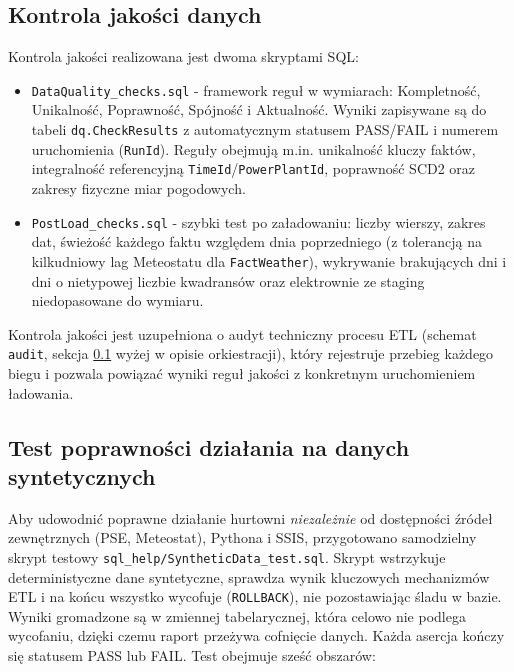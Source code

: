 \documentclass[12pt]{article}
\begin{document}
	\subsection{Kontrola jakości danych}
	\label{sec:dq}
	Kontrola jakości realizowana jest dwoma skryptami SQL:
	\begin{itemize}
		\item \texttt{DataQuality\_checks.sql} - framework reguł w wymiarach: Kompletność, Unikalność, Poprawność, Spójność i Aktualność. Wyniki zapisywane są do tabeli \texttt{dq.CheckResults} z automatycznym statusem PASS/FAIL i numerem uruchomienia (\texttt{RunId}). Reguły obejmują m.in. unikalność kluczy faktów, integralność referencyjną \texttt{TimeId}/\texttt{PowerPlantId}, poprawność SCD2 oraz zakresy fizyczne miar pogodowych.
		\item \texttt{PostLoad\_checks.sql} - szybki test po załadowaniu: liczby wierszy, zakres dat, świeżość każdego faktu względem dnia poprzedniego (z tolerancją na kilkudniowy lag Meteostatu dla \texttt{FactWeather}), wykrywanie brakujących dni i dni o nietypowej liczbie kwadransów oraz elektrownie ze staging niedopasowane do wymiaru.
	\end{itemize}
	Kontrola jakości jest uzupełniona o audyt techniczny procesu ETL (schemat \texttt{audit}, sekcja \ref{sec:dq} wyżej w opisie orkiestracji), który rejestruje przebieg każdego biegu i pozwala powiązać wyniki reguł jakości z konkretnym uruchomieniem ładowania.

	\subsection{Test poprawności działania na danych syntetycznych}
	\label{sec:synttest}

	Aby udowodnić poprawne działanie hurtowni \emph{niezależnie} od dostępności źródeł zewnętrznych (PSE, Meteostat), Pythona i SSIS, przygotowano samodzielny skrypt testowy \texttt{sql\_help/SyntheticData\_test.sql}. Skrypt wstrzykuje deterministyczne dane syntetyczne, sprawdza wynik kluczowych mechanizmów ETL i na końcu wszystko wycofuje (\texttt{ROLLBACK}), nie pozostawiając śladu w bazie. Wyniki gromadzone są w zmiennej tabelarycznej, która celowo nie podlega wycofaniu, dzięki czemu raport przeżywa cofnięcie danych. Każda asercja kończy się statusem PASS lub FAIL. Test obejmuje sześć obszarów:
\end{document}
